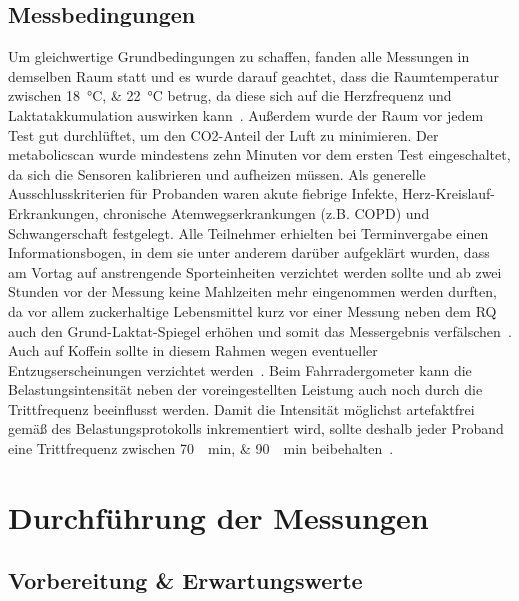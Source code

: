 \subsection{Messbedingungen}

Um gleichwertige Grundbedingungen zu schaffen, fanden alle Messungen in demselben Raum statt und es wurde darauf geachtet, dass die Raumtemperatur zwischen \SIlist{18;22}{\degreeCelsius} betrug, da diese sich auf die Herzfrequenz und Laktatakkumulation auswirken kann~\cite{Marino.2001}. Außerdem wurde der Raum vor jedem Test gut durchlüftet, um den \acs{CO2}-Anteil der Luft zu minimieren. Der metabolicscan wurde mindestens zehn Minuten vor dem ersten Test eingeschaltet, da sich die Sensoren kalibrieren und aufheizen müssen.
Als generelle Ausschlusskriterien für Probanden waren akute fiebrige Infekte, Herz-Kreislauf-Erkrankungen, chronische Atemwegserkrankungen (z.B. COPD) und Schwangerschaft festgelegt. Alle Teilnehmer erhielten bei Terminvergabe einen Informationsbogen, in dem sie unter anderem darüber aufgeklärt wurden, dass am Vortag auf anstrengende Sporteinheiten verzichtet werden sollte und ab zwei Stunden vor der Messung keine Mahlzeiten mehr eingenommen werden durften, da vor allem zuckerhaltige Lebensmittel kurz vor einer Messung neben dem RQ auch den Grund-Laktat-Spiegel erhöhen und somit das Messergebnis verfälschen~\cite{Ivy.1981}. Auch auf Koffein sollte in diesem Rahmen wegen eventueller Entzugserscheinungen verzichtet werden~\cite{Kroidl.2015}. Beim Fahrradergometer kann die Belastungsintensität neben der voreingestellten Leistung auch noch durch die Trittfrequenz beeinflusst werden. Damit die Intensität möglichst artefaktfrei gemäß des Belastungsprotokolls inkrementiert wird, sollte deshalb jeder Proband eine Trittfrequenz zwischen \SIlist{70;90}{\per\minute} beibehalten~\cite{Wonisch.2008}.

\section{Durchführung der Messungen}

\subsection{Vorbereitung \& Erwartungswerte}

